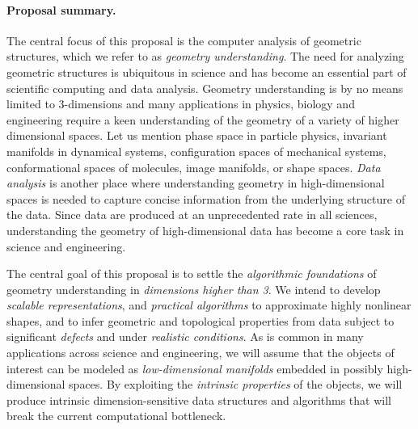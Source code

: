 


\paragraph{Proposal summary.} 
The central focus of this proposal is the computer analysis of
geometric structures, which we refer to as {\em geometry
  understanding}.  The need for analyzing geometric structures is
ubiquitous in science and has become an essential part of scientific
computing and data analysis. Geometry understanding is by no means
limited to 3-dimensions and many applications in physics, biology and
engineering require a keen understanding of the geometry of a variety
of higher dimensional spaces. Let us mention phase space in particle
physics, invariant manifolds in dynamical systems, configuration
spaces of mechanical systems, conformational spaces of molecules,
image manifolds, or shape spaces.
{\em Data analysis}  is another place where understanding
geometry in high-dimensional spaces is needed to
capture concise information from the underlying structure of the data.  
Since data are produced at an unprecedented rate in all
sciences, understanding the geometry of high-dimensional data %
has become a core task in science and engineering.

The central goal of this proposal is to settle the {\em algorithmic
foundations} of geometry understanding in {\em dimensions higher than
3}.  We intend to develop {\em scalable representations}, and {\em
practical algorithms} to approximate highly nonlinear shapes, and to
infer geometric and topological properties from data subject to
significant {\em defects} and under {\em realistic conditions}.
As is common in many applications across science and engineering, we
will assume that the objects of interest can be modeled as {\em
  low-dimensional manifolds} embedded in possibly high-dimensional
spaces. By exploiting the {\em intrinsic properties} of the objects,
we will produce intrinsic dimension-sensitive data structures and algorithms
that will break the current computational
bottleneck.


